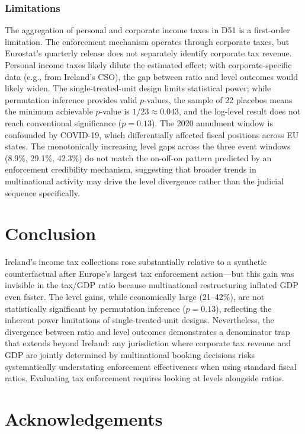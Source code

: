 \documentclass[12pt]{article}
\begin{document}
\subsubsection*{Limitations} The aggregation of personal and corporate income taxes in D51 is a first-order limitation. The enforcement mechanism operates through corporate taxes, but Eurostat's quarterly release does not separately identify corporate tax revenue. Personal income taxes likely dilute the estimated effect; with corporate-specific data (e.g., from Ireland's CSO), the gap between ratio and level outcomes would likely widen. The single-treated-unit design limits statistical power; while permutation inference provides valid $p$-values, the sample of 22 placebos means the minimum achievable $p$-value is $1/23 \approx 0.043$, and the log-level result does not reach conventional significance ($p = 0.13$). The 2020 annulment window is confounded by COVID-19, which differentially affected fiscal positions across EU states. The monotonically increasing level gaps across the three event windows (8.9\%, 29.1\%, 42.3\%) do not match the on-off-on pattern predicted by an enforcement credibility mechanism, suggesting that broader trends in multinational activity may drive the level divergence rather than the judicial sequence specifically.

\section{Conclusion}

Ireland's income tax collections rose substantially relative to a synthetic counterfactual after Europe's largest tax enforcement action---but this gain was invisible in the tax/GDP ratio because multinational restructuring inflated GDP even faster. The level gains, while economically large (21--42\%), are not statistically significant by permutation inference ($p = 0.13$), reflecting the inherent power limitations of single-treated-unit designs. Nevertheless, the divergence between ratio and level outcomes demonstrates a denominator trap that extends beyond Ireland: any jurisdiction where corporate tax revenue and GDP are jointly determined by multinational booking decisions risks systematically understating enforcement effectiveness when using standard fiscal ratios. Evaluating tax enforcement requires looking at levels alongside ratios.

\section*{Acknowledgements}
\end{document}
